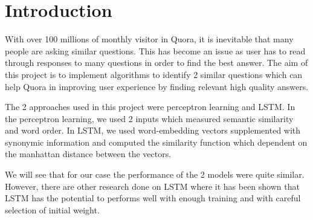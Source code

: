 \section{Introduction}
\justify
With over 100 millions of monthly visitor in Quora, it is inevitable that many people are asking similar questions. This has become an issue as user has to read through responses to many questions in order to find the best answer. The aim of this project is to implement algorithms to identify 2 similar questions which can help Quora in improving user experience by finding relevant high quality answers.

The 2 approaches used in this project were perceptron learning and LSTM. In the perceptron learning, we used 2 inputs which measured semantic similarity and word order. In LSTM, we used word-embedding vectors supplemented with synonymic information and computed the similarity function which dependent on the manhattan distance between the vectors.

We will see that for our case the performance of the 2 models were quite similar. However, there are other research done on LSTM where it has been shown that LSTM has the potential to performs well with enough training and with careful selection of initial weight.